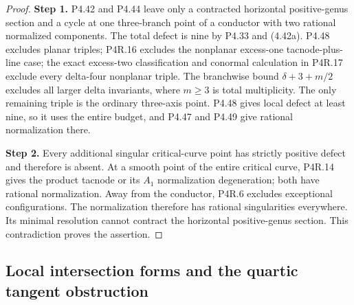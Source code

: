 \begin{proof}
\noindent\textbf{Step 1.} P4.42 and P4.44 leave only a contracted horizontal
positive-genus section and a cycle at one three-branch
point of a conductor with two rational normalized
components. The total defect is nine by P4.33 and
(4.42a). P4.48 excludes planar triples; P4R.16
excludes the nonplanar excess-one tacnode-plus-line
case; the exact excess-two classification and conormal
calculation in P4R.17 exclude
every delta-four nonplanar triple. The branchwise bound
$\delta+3+m/2$ excludes all larger delta invariants,
where $m\ge3$ is total multiplicity.
The only remaining triple is the ordinary three-axis
point. P4.48 gives local defect at least nine, so it
uses the entire budget, and P4.47 and P4.49 give
rational normalization there.

\noindent\textbf{Step 2.} Every additional singular critical-curve point has
strictly positive defect and therefore is absent.
At a smooth point of the entire critical curve,
P4R.14 gives the product tacnode or its $A_1$
normalization degeneration; both have rational
normalization. Away from the conductor, P4R.6
excludes exceptional configurations. The normalization
therefore has rational singularities everywhere.
Its minimal resolution cannot contract the horizontal
positive-genus section. This contradiction proves
the assertion.
\end{proof}


\subsection{Local intersection forms and the quartic tangent obstruction}

